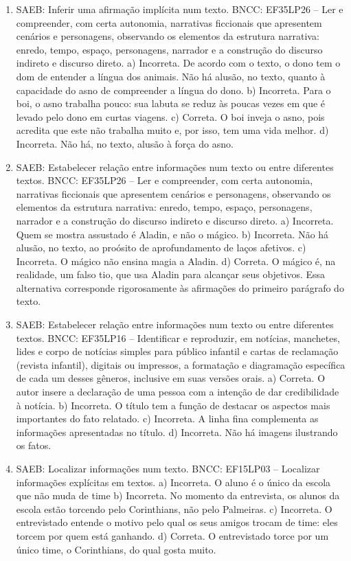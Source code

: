 \begin{enumerate}
\item
SAEB: Inferir uma afirmação implícita num texto. BNCC: EF35LP26 -- Ler e compreender, com certa autonomia, narrativas ficcionais que apresentem cenários e personagens, observando os elementos da estrutura narrativa: enredo, tempo, espaço, personagens, narrador e a construção do discurso indireto e discurso direto. a) Incorreta. De acordo com o texto, o dono tem o dom de entender a língua dos animais. Não há alusão, no texto, quanto à capacidade do asno de compreender a língua do dono. b) Incorreta. Para o boi, o asno trabalha pouco: sua labuta se reduz às poucas vezes em que é levado pelo dono em curtas viagens. c) Correta. O boi inveja o asno, pois acredita que este não trabalha muito e, por isso, tem uma vida melhor.
d) Incorreta. Não há, no texto, alusão à força do asno.

\item
SAEB: Estabelecer relação entre informações num texto ou entre diferentes textos. BNCC: EF35LP26 -- Ler e compreender, com certa autonomia, narrativas ficcionais que apresentem cenários e personagens, observando os elementos da estrutura narrativa: enredo, tempo, espaço, personagens, narrador e a construção do discurso indireto e discurso direto. a) Incorreta. Quem se mostra assustado é Aladin, e não o mágico. b) Incorreta. Não há alusão, no texto, ao proósito de aprofundamento de laços afetivos. c) Incorreta. O mágico não ensina magia a Aladin. d) Correta. O mágico é, na realidade, um falso tio, que usa Aladin para alcançar seus objetivos. Essa alternativa corresponde rigorosamente às afirmações do primeiro parágrafo do texto.

\item
SAEB: Estabelecer relação entre informações num texto ou entre diferentes textos. BNCC: EF35LP16 -- Identificar e reproduzir, em notícias, manchetes, lides e corpo de notícias simples para público infantil e cartas de reclamação (revista infantil), digitais ou impressos, a formatação e diagramação específica de cada um desses gêneros, inclusive em suas versões orais. a) Correta. O autor insere a declaração de uma pessoa com a intenção de dar credibilidade à notícia. b) Incorreta. O título tem a função de destacar os aspectos mais importantes do fato relatado. c) Incorreta. A linha fina complementa as informações apresentadas no título. d) Incorreta. Não há imagens ilustrando os fatos.

\item
SAEB: Localizar informações num texto. BNCC: EF15LP03 -- Localizar informações explícitas em textos. a) Incorreta. O aluno é o único da escola que não muda de time b) Incorreta. No momento da entrevista, os alunos da escola estão torcendo pelo Corinthians, não pelo Palmeiras. c) Incorreta. O entrevistado entende o motivo pelo qual os seus amigos trocam de time: eles torcem por quem está ganhando. d) Correta. O entrevistado torce por um único time, o Corinthians, do qual gosta muito.


\end{enumerate}
